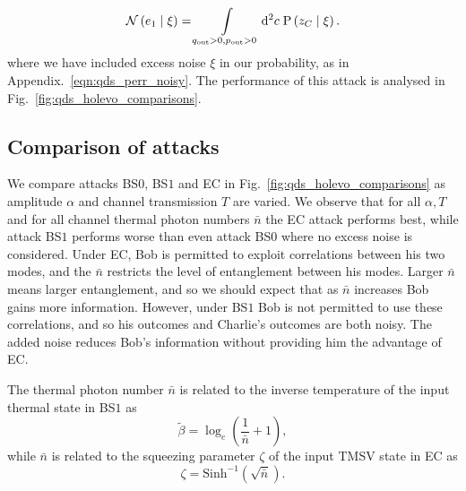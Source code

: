 \begin{equation}
\mathcal{N}\left(e_1 \; \middle| \; \xi\right) = \int\limits_{q_{\text{out}}>0, p_{\text{out}}>0} \mathop{}\!\mathrm{d^2} c \; \text{P}\left(z_C \; \middle| \; \xi \right).
\end{equation}
where we have included excess noise $\xi$ in our probability, as in Appendix.~\ref{eqn:qds_perr_noisy}. The performance of this attack is analysed in Fig.~\ref{fig:qds_holevo_comparisons}.


\subsection{Comparison of attacks}

We compare attacks BS$0$, BS$1$ and EC in Fig.~\ref{fig:qds_holevo_comparisons} as amplitude $\alpha$ and channel transmission $T$ are varied. We observe that for all $\alpha, T$ and for all channel thermal photon numbers $\bar{n}$ the EC attack performs best, while attack BS$1$ performs worse than even attack BS$0$ where no excess noise is considered. Under EC, Bob is permitted to exploit correlations between his two modes, and the $\bar{n}$ restricts the level of entanglement between his modes. Larger $\bar{n}$ means larger entanglement, and so we should expect that as $\bar{n}$ increases Bob gains more information. However, under BS$1$ Bob is not permitted to use these correlations, and so his outcomes and Charlie's outcomes are both noisy. The added noise reduces Bob's information without providing him the advantage of EC. 

The thermal photon number $\bar{n}$ is related to the inverse temperature of the input thermal state in BS$1$ as \cite{Leonhardt2010}
\begin{equation}
\tilde{\beta} = \log_e\left(\frac{1}{\bar{n}} + 1\right),
\end{equation}
while $\bar{n}$ is related to the squeezing parameter $\zeta$ of the input TMSV state in EC as \cite{Leonhardt2010}
\begin{equation}
\zeta = \text{Sinh}^{-1}\left(\sqrt{\bar{n}}\right).
\end{equation}

